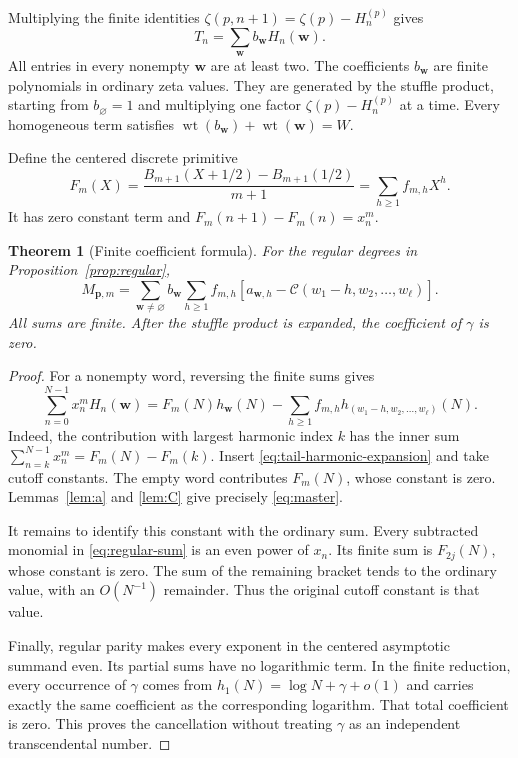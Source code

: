 \documentclass[11pt,letterpaper]{article}
\numberwithin{equation}{section}
\newtheorem{theorem}{Theorem}[section]
\theoremstyle{definition}\newtheorem{definition}[theorem]{Definition}
\theoremstyle{remark}\newtheorem{remark}[theorem]{Remark}
\DeclareMathOperator{\wt}{wt}
\begin{document}
Multiplying the finite identities
$\zeta(p,n+1)=\zeta(p)-H_n^{(p)}$ gives
\begin{equation}\label{eq:tail-harmonic-expansion}
 T_n=\sum_{\boldsymbol w}b_{\boldsymbol w}H_n(\boldsymbol w).
\end{equation}
All entries in every nonempty $\boldsymbol w$ are at least two.
The coefficients $b_{\boldsymbol w}$ are finite polynomials in
ordinary zeta values. They are generated by the stuffle product,
starting from $b_{\varnothing}=1$ and multiplying one factor
$\zeta(p)-H_n^{(p)}$ at a time. Every homogeneous term satisfies
$\wt(b_{\boldsymbol w})+\wt(\boldsymbol w)=W$.

Define the centered discrete primitive
\begin{equation}\label{eq:Fm}
 F_m(X)=\frac{B_{m+1}(X+1/2)-B_{m+1}(1/2)}{m+1}
       =\sum_{h\ge1}f_{m,h}X^h.
\end{equation}
It has zero constant term and
$F_m(n+1)-F_m(n)=x_n^m$.

\begin{theorem}[Finite coefficient formula]\label{thm:master}
For the regular degrees in Proposition~\ref{prop:regular},
\begin{equation}\label{eq:master}
 \boxed{M_{\boldsymbol p,m}=
 \sum_{\boldsymbol w\ne\varnothing}b_{\boldsymbol w}
 \sum_{h\ge1}f_{m,h}
 \left[a_{\boldsymbol w,h}
 -\mathcal C(w_1-h,w_2,\ldots,w_\ell)\right].}
\end{equation}
All sums are finite. After the stuffle product is expanded, the
coefficient of $\gamma$ is zero.
\end{theorem}

\begin{proof}
For a nonempty word, reversing the finite sums gives
\begin{equation}\label{eq:finite-centered}
 \sum_{n=0}^{N-1}x_n^m H_n(\boldsymbol w)
 =F_m(N)h_{\boldsymbol w}(N)
 -\sum_{h\ge1}f_{m,h}h_{(w_1-h,w_2,\ldots,w_\ell)}(N).
\end{equation}
Indeed, the contribution with largest harmonic index $k$ has the
inner sum $\sum_{n=k}^{N-1}x_n^m=F_m(N)-F_m(k)$.
Insert \eqref{eq:tail-harmonic-expansion} and take cutoff constants.
The empty word contributes $F_m(N)$, whose constant is zero.
Lemmas~\ref{lem:a} and \ref{lem:C} give precisely \eqref{eq:master}.

It remains to identify this constant with the ordinary sum.
Every subtracted monomial in \eqref{eq:regular-sum} is an even power
of $x_n$. Its finite sum is $F_{2j}(N)$, whose constant is zero.
The sum of the remaining bracket tends to the ordinary value, with
an $O(N^{-1})$ remainder. Thus the original cutoff constant is that
value.

Finally, regular parity makes every exponent in the centered
asymptotic summand even. Its partial sums have no logarithmic term.
In the finite reduction, every occurrence of $\gamma$ comes from
$h_1(N)=\log N+\gamma+o(1)$ and carries exactly the same coefficient
as the corresponding logarithm. That total coefficient is zero.
This proves the cancellation without treating $\gamma$ as an
independent transcendental number.
\end{proof}
\end{document}
